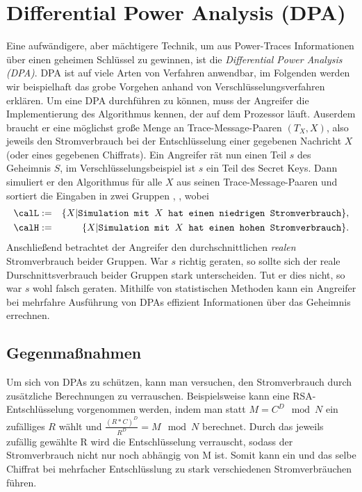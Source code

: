 \section{Differential Power Analysis (DPA)}
Eine aufwändigere, aber mächtigere Technik, um aus Power-Traces
Informationen über einen geheimen Schlüssel zu gewinnen, ist die
\emph{Differential Power Analysis (DPA)}. DPA ist auf viele Arten von
Verfahren anwendbar, im Folgenden werden wir beispielhaft das grobe
Vorgehen anhand von Verschlüsselungsverfahren erklären. Um eine DPA
durchführen zu können, muss der Angreifer die Implementierung des
Algorithmus kennen, der auf dem Prozessor läuft. Auserdem braucht er
eine möglichst große Menge an Trace-Message-Paaren $(T_X, X)$, also
jeweils den Stromverbrauch bei der Entschlüsselung einer gegebenen
Nachricht $X$ (oder eines gegebenen Chiffrats).
Ein Angreifer rät nun einen Teil $s$ des Geheimnis $S$, im
Verschlüsselungsbeispiel ist $s$ ein Teil des Secret Keys. Dann
simuliert er den Algorithmus für alle $X$ aus seinen
Trace-Message-Paaren und sortiert die Eingaben in zwei Gruppen \calL,
\calH, wobei
\begin{eqnarray*}
\calL & := &\{X| \texttt{Simulation mit $X$ hat einen niedrigen
  Stromverbrauch}\},\\
\calH & := &\{X| \texttt{Simulation mit $X$ hat einen hohen
  Stromverbrauch}\}.
\end{eqnarray*}
Anschließend betrachtet der Angreifer den durchschnittlichen
\textit{realen} Stromverbrauch beider Gruppen. War $s$ richtig geraten,
so sollte sich der reale Durschnittsverbrauch beider Gruppen stark
unterscheiden. Tut er dies nicht, so war $s$ wohl falsch
geraten. Mithilfe von statistischen Methoden kann ein Angreifer bei
mehrfahre Ausführung von DPAs effizient Informationen über das Geheimnis
errechnen. 

\subsection{Gegenmaßnahmen}
Um sich von DPAs zu schützen, kann man versuchen, den Stromverbrauch
durch zusätzliche Berechnungen zu verrauschen. Beispielsweise kann eine
RSA-Entschlüsselung vorgenommen werden, indem man statt $M = C^D \mod N$
ein zufälliges $R$ wählt und $\frac{(R*C)^D}{R^D} = M \mod N$ berechnet. Durch das
jeweils zufällig gewählte R wird die Entschlüsselung verrauscht, sodass
der Stromverbrauch nicht nur noch abhängig von M ist. Somit kann ein und
das selbe Chiffrat bei mehrfacher Entschlüsslung zu stark verschiedenen
Stromverbräuchen führen. 

